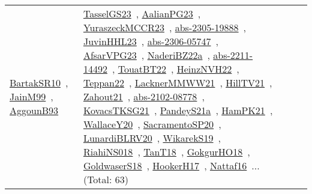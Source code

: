 {\begin{longtable}{lp{3cm}>{\raggedright\arraybackslash}p{6cm}>{\raggedright\arraybackslash}p{6cm}>{\raggedright\arraybackslash}p{8cm}}
\href{works/BartakSR10.pdf}{BartakSR10}~\cite{BartakSR10}, \href{works/JainM99.pdf}{JainM99}~\cite{JainM99}, \href{works/AggounB93.pdf}{AggounB93}~\cite{AggounB93} & \href{works/TasselGS23.pdf}{TasselGS23}~\cite{TasselGS23}, \href{works/AalianPG23.pdf}{AalianPG23}~\cite{AalianPG23}, \href{works/YuraszeckMCCR23.pdf}{YuraszeckMCCR23}~\cite{YuraszeckMCCR23}, \href{works/abs-2305-19888.pdf}{abs-2305-19888}~\cite{abs-2305-19888}, \href{works/JuvinHHL23.pdf}{JuvinHHL23}~\cite{JuvinHHL23}, \href{works/abs-2306-05747.pdf}{abs-2306-05747}~\cite{abs-2306-05747}, \href{works/AfsarVPG23.pdf}{AfsarVPG23}~\cite{AfsarVPG23}, \href{works/NaderiBZ22a.pdf}{NaderiBZ22a}~\cite{NaderiBZ22a}, \href{works/abs-2211-14492.pdf}{abs-2211-14492}~\cite{abs-2211-14492}, \href{works/TouatBT22.pdf}{TouatBT22}~\cite{TouatBT22}, \href{works/HeinzNVH22.pdf}{HeinzNVH22}~\cite{HeinzNVH22}, \href{works/Teppan22.pdf}{Teppan22}~\cite{Teppan22}, \href{works/LacknerMMWW21.pdf}{LacknerMMWW21}~\cite{LacknerMMWW21}, \href{works/HillTV21.pdf}{HillTV21}~\cite{HillTV21}, \href{works/Zahout21.pdf}{Zahout21}~\cite{Zahout21}, \href{works/abs-2102-08778.pdf}{abs-2102-08778}~\cite{abs-2102-08778}, \href{works/KovacsTKSG21.pdf}{KovacsTKSG21}~\cite{KovacsTKSG21}, \href{works/PandeyS21a.pdf}{PandeyS21a}~\cite{PandeyS21a}, \href{works/HamPK21.pdf}{HamPK21}~\cite{HamPK21}, \href{works/WallaceY20.pdf}{WallaceY20}~\cite{WallaceY20}, \href{works/SacramentoSP20.pdf}{SacramentoSP20}~\cite{SacramentoSP20}, \href{works/LunardiBLRV20.pdf}{LunardiBLRV20}~\cite{LunardiBLRV20}, \href{works/WikarekS19.pdf}{WikarekS19}~\cite{WikarekS19}, \href{works/RiahiNS018.pdf}{RiahiNS018}~\cite{RiahiNS018}, \href{works/TanT18.pdf}{TanT18}~\cite{TanT18}, \href{works/GokgurHO18.pdf}{GokgurHO18}~\cite{GokgurHO18}, \href{works/GoldwaserS18.pdf}{GoldwaserS18}~\cite{GoldwaserS18}, \href{works/HookerH17.pdf}{HookerH17}~\cite{HookerH17}, \href{works/Nattaf16.pdf}{Nattaf16}~\cite{Nattaf16}... (Total: 63)\\

\end{longtable}}
